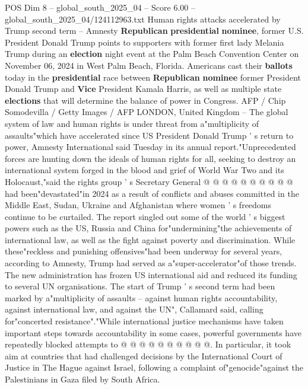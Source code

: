 \begin{textsample}{POS Dim 8 – global\_south\_2025\_04 – Score 6.00 – global\_south\_2025\_04/124112963.txt}  \label{ex:f8_pos_409}
Human rights attacks accelerated by Trump second term -- Amnesty \textbf{Republican} \textbf{presidential} \textbf{nominee}, former U.S.
President Donald Trump points to supporters with former first lady Melania Trump during an \textbf{election} night event at the Palm Beach Convention Center on November 06, 2024 in West Palm Beach, Florida.
Americans cast their \textbf{ballots} today in the \textbf{presidential} race between \textbf{Republican} \textbf{nominee} former President Donald Trump and \textbf{Vice} President Kamala Harris, as well as multiple state \textbf{elections} that will determine the balance of power in Congress.
AFP / Chip Somodevilla / Getty Images / AFP LONDON, United Kingdom -- The global system of law and human rights is under threat from a"multiplicity of assaults"which have accelerated since US President Donald Trump ' s return to power, Amnesty International said Tuesday in its annual report."Unprecedented forces are hunting down the ideals of human rights for all, seeking to destroy an international system forged in the blood and grief of World War Two and its Holocaust,"said the rights group ' s Secretary General @ @ @ @ @ @ @ @ @ @ had been"devastated"in 2024 as a result of conflicts and abuses committed in the Middle East, Sudan, Ukraine and Afghanistan where women ' s freedoms continue to be curtailed.
The report singled out some of the world ' s biggest powers such as the US, Russia and China for"undermining"the achievements of international law, as well as the fight against poverty and discrimination.
While these"reckless and punishing offensives"had been underway for several years, according to Amnesty, Trump had served as a"super-accelerator"of those trends.
The new administration has frozen US international aid and reduced its funding to several UN organisations.
The start of Trump ' s second term had been marked by a"multiplicity of assaults -- against human rights accountability, against international law, and against the UN", Callamard said, calling for"concerted resistance"."While international justice mechanisms have taken important steps towards accountability in some cases, powerful governments have repeatedly blocked attempts to @ @ @ @ @ @ @ @ @ @.
In particular, it took aim at countries that had challenged decisions by the International Court of Justice in The Hague against Israel, following a complaint of"genocide"against the Palestinians in Gaza filed by South Africa.

\end{textsample}
